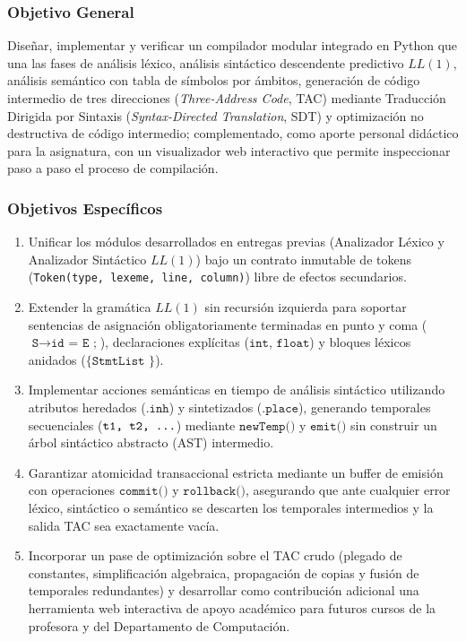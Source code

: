 \documentclass[11pt, letterpaper]{article}
\begin{document}
\subsubsection*{Objetivo General}
Diseñar, implementar y verificar un compilador modular integrado en Python que una las fases de análisis léxico, análisis sintáctico descendente predictivo $LL(1)$, análisis semántico con tabla de símbolos por ámbitos, generación de código intermedio de tres direcciones (\textit{Three-Address Code}, TAC) mediante Traducción Dirigida por Sintaxis (\textit{Syntax-Directed Translation}, SDT) y optimización no destructiva de código intermedio; complementado, como aporte personal didáctico para la asignatura, con un visualizador web interactivo que permite inspeccionar paso a paso el proceso de compilación.

\subsubsection*{Objetivos Específicos}
\begin{enumerate}[leftmargin=1.8em]
    \item Unificar los módulos desarrollados en entregas previas (Analizador Léxico y Analizador Sintáctico $LL(1)$) bajo un contrato inmutable de tokens (\texttt{Token(type, lexeme, line, column)}) libre de efectos secundarios.
    \item Extender la gramática $LL(1)$ sin recursión izquierda para soportar sentencias de asignación obligatoriamente terminadas en punto y coma ($\texttt{S} \rightarrow \texttt{id = E ;}$), declaraciones explícitas ($\texttt{int}$, $\texttt{float}$) y bloques léxicos anidados ($\texttt{\{ StmtList \}}$).
    \item Implementar acciones semánticas en tiempo de análisis sintáctico utilizando atributos heredados ($\texttt{.inh}$) y sintetizados ($\texttt{.place}$), generando temporales secuenciales ($\texttt{t1, t2, \dots}$) mediante $\texttt{newTemp()}$ y $\texttt{emit()}$ sin construir un árbol sintáctico abstracto (AST) intermedio.
    \item Garantizar atomicidad transaccional estricta mediante un buffer de emisión con operaciones $\texttt{commit()}$ y $\texttt{rollback()}$, asegurando que ante cualquier error léxico, sintáctico o semántico se descarten los temporales intermedios y la salida TAC sea exactamente vacía.
    \item Incorporar un pase de optimización sobre el TAC crudo (plegado de constantes, simplificación algebraica, propagación de copias y fusión de temporales redundantes) y desarrollar como contribución adicional una herramienta web interactiva de apoyo académico para futuros cursos de la profesora y del Departamento de Computación.
\end{enumerate}
\end{document}
